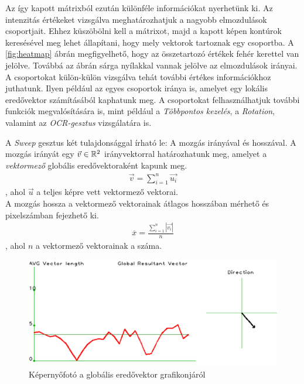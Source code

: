 Az így kapott mátrixból ezután különféle információkat nyerhetünk ki. Az intenzitás értékeket vizsgálva meghatározhatjuk a nagyobb elmozdulások csoportjait. Ehhez küszöbölni kell a mátrixot, majd a kapott képen kontúrok keresésével meg lehet állapítani, hogy mely vektorok tartoznak egy csoportba. A \ref{fig:heatmap} ábrán megfigyelhető, hogy az összetartozó értékek fehér kerettel van jelölve. Továbbá az ábrán sárga nyílakkal vannak jelölve az elmozdulások irányai. A csoportokat külön-külön vizsgálva tehát további értékes információkhoz juthatunk. Ilyen például az egyes csoportok iránya is, amelyet egy lokális eredővektor számításából kaphatunk meg. A csoportokat felhasználhatjuk további funkciók megvalósítására is, mint például a \textit{Többpontos kezelés}, a \textit{Rotation}, valamint az \textit{OCR-gesztus} vizsgálatára is.



A \textit{Sweep} gesztus két tulajdonsággal írható le: A mozgás irányával és hosszával. A mozgás irányát egy $\vec{v}\in\Bbb R^2$ irányvektorral határozhatunk meg, amelyet a \textit{vektormező} globális eredővektoraként kapunk meg.
\begin{align*}
  \vec{v} = \sum_{i=1}^n\vec{u_i}
\end{align*}
, ahol $\vec{u}$ a teljes képre vett vektormező vektorai.\\
A mozgás hossza a vektormező vektorainak átlagos hosszában mérhető és pixelszámban fejezhető ki.
\begin{align*}
  \overline{x}=\frac{\sum_{i=1}^n \left|\vec{v_i}\right|}{n}
\end{align*}
, ahol $n$ a vektormező vektorainak a száma.

\begin{figure}[h]
\centering
\includegraphics[width=11.86truecm, height=5truecm]{images/ResultantPlot_screenshot.png}
\caption{Képernyőfotó a globális eredővektor grafikonjáról}
\label{fig:resultantplot}
\end{figure}


